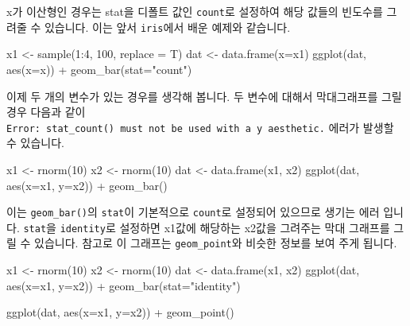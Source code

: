 \documentclass[
]{book}
\newenvironment{Shaded}{\begin{snugshade}}{\end{snugshade}}
\newcommand{\AttributeTok}[1]{\textcolor[rgb]{0.77,0.63,0.00}{#1}}
\newcommand{\DecValTok}[1]{\textcolor[rgb]{0.00,0.00,0.81}{#1}}
\newcommand{\FunctionTok}[1]{\textcolor[rgb]{0.00,0.00,0.00}{#1}}
\newcommand{\NormalTok}[1]{#1}
\newcommand{\OtherTok}[1]{\textcolor[rgb]{0.56,0.35,0.01}{#1}}
\newcommand{\SpecialCharTok}[1]{\textcolor[rgb]{0.00,0.00,0.00}{#1}}
\newcommand{\StringTok}[1]{\textcolor[rgb]{0.31,0.60,0.02}{#1}}
\begin{document}
x가 이산형인 경우는 stat을 디폴트 값인 \texttt{count}로 설정하여 해당 값들의 빈도수를 그려줄 수 있습니다. 이는 앞서 \texttt{iris}에서 배운 예제와 같습니다.

\begin{Shaded}
\begin{Highlighting}[]
\NormalTok{x1 }\OtherTok{\textless{}{-}} \FunctionTok{sample}\NormalTok{(}\DecValTok{1}\SpecialCharTok{:}\DecValTok{4}\NormalTok{, }\DecValTok{100}\NormalTok{, }\AttributeTok{replace =}\NormalTok{ T)}
\NormalTok{dat }\OtherTok{\textless{}{-}} \FunctionTok{data.frame}\NormalTok{(}\AttributeTok{x=}\NormalTok{x1)}
\FunctionTok{ggplot}\NormalTok{(dat, }\FunctionTok{aes}\NormalTok{(}\AttributeTok{x=}\NormalTok{x)) }\SpecialCharTok{+}
  \FunctionTok{geom\_bar}\NormalTok{(}\AttributeTok{stat=}\StringTok{"count"}\NormalTok{)}
\end{Highlighting}
\end{Shaded}

이제 두 개의 변수가 있는 경우를 생각해 봅니다. 두 변수에 대해서 막대그래프를 그릴 경우 다음과 같이 \texttt{Error:\ stat\_count()\ must\ not\ be\ used\ with\ a\ y\ aesthetic.} 에러가 발생할 수 있습니다.

\begin{Shaded}
\begin{Highlighting}[]
\NormalTok{x1 }\OtherTok{\textless{}{-}} \FunctionTok{rnorm}\NormalTok{(}\DecValTok{10}\NormalTok{)}
\NormalTok{x2 }\OtherTok{\textless{}{-}} \FunctionTok{rnorm}\NormalTok{(}\DecValTok{10}\NormalTok{)}
\NormalTok{dat }\OtherTok{\textless{}{-}} \FunctionTok{data.frame}\NormalTok{(x1, x2)}
\FunctionTok{ggplot}\NormalTok{(dat, }\FunctionTok{aes}\NormalTok{(}\AttributeTok{x=}\NormalTok{x1, }\AttributeTok{y=}\NormalTok{x2)) }\SpecialCharTok{+}
  \FunctionTok{geom\_bar}\NormalTok{()}
\end{Highlighting}
\end{Shaded}

이는 \texttt{geom\_bar()}의 \texttt{stat}이 기본적으로 \texttt{count}로 설정되어 있으므로 생기는 에러 입니다. \texttt{stat}을 \texttt{identity}로 설정하면 x1값에 해당하는 x2값을 그려주는 막대 그래프를 그릴 수 있습니다. 참고로 이 그래프는 \texttt{geom\_point}와 비슷한 정보를 보여 주게 됩니다.

\begin{Shaded}
\begin{Highlighting}[]
\NormalTok{x1 }\OtherTok{\textless{}{-}} \FunctionTok{rnorm}\NormalTok{(}\DecValTok{10}\NormalTok{)}
\NormalTok{x2 }\OtherTok{\textless{}{-}} \FunctionTok{rnorm}\NormalTok{(}\DecValTok{10}\NormalTok{)}
\NormalTok{dat }\OtherTok{\textless{}{-}} \FunctionTok{data.frame}\NormalTok{(x1, x2)}
\FunctionTok{ggplot}\NormalTok{(dat, }\FunctionTok{aes}\NormalTok{(}\AttributeTok{x=}\NormalTok{x1, }\AttributeTok{y=}\NormalTok{x2)) }\SpecialCharTok{+}
  \FunctionTok{geom\_bar}\NormalTok{(}\AttributeTok{stat=}\StringTok{"identity"}\NormalTok{)}

\FunctionTok{ggplot}\NormalTok{(dat, }\FunctionTok{aes}\NormalTok{(}\AttributeTok{x=}\NormalTok{x1, }\AttributeTok{y=}\NormalTok{x2)) }\SpecialCharTok{+}
  \FunctionTok{geom\_point}\NormalTok{()}
\end{Highlighting}
\end{Shaded}
\end{document}
